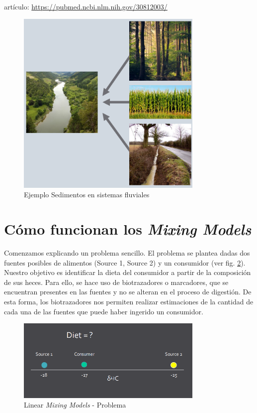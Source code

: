 artículo: \url{https://pubmed.ncbi.nlm.nih.gov/30812003/}

\begin{figure}[h!] 
\centering
    \includegraphics[width=0.8\textwidth]{img/soilSediment.PNG}
\caption{Ejemplo Sedimentos en sistemas fluviales }
\label{fig:soilSediment}
\end{figure}


\clearpage

\section{Cómo funcionan los \emph{Mixing Models}}

Comenzamos explicando un problema sencillo. El problema se plantea dadas dos fuentes posibles de alimentos (Source 1, Source 2) y un consumidor (ver fig. \ref{fig:workMixing0}). Nuestro objetivo es identificar la dieta del consumidor a partir de la composición de sus heces. Para ello, se hace uso de biotrazadores o marcadores, que se encuentran presentes en las fuentes y no se alteran en el proceso de digestión. De esta forma, los biotrazadores nos permiten realizar estimaciones de la cantidad de cada una de las fuentes que puede haber ingerido un consumidor. 

\begin{figure}[h!] 
\centering
    \includegraphics[width=0.8\textwidth]{img/workMixing0.PNG}
\caption{Linear \emph{Mixing Models} - Problema }
\label{fig:workMixing0}
\end{figure}

